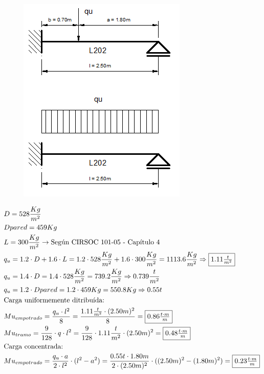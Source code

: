 \begin{enumerate}
\begin{itemize}
\begin{figure}[H]
\begin{center}
     \includegraphics[scale = 0.8]{chapters/chapter_1/images/l202.png}
\end{center}
\end{figure}
\begin{align*}
& D = 528 \frac{Kg}{m^2}\\
& Dpared = 459 Kg\\
& L = 300 \frac{Kg}{m^2} \rightarrow \text{Según CIRSOC 101-05 - Capítulo 4}\\
& q_u = 1.2 \cdot D + 1.6 \cdot L = 1.2 \cdot 528 \frac{Kg}{m^2} + 1.6 \cdot 300 \frac{Kg}{m^2} = 1113.6 \frac{Kg}{m^2} \Rightarrow \framebox{$1.11 \frac{t}{m^2}$} \\
& q_u = 1.4 \cdot D = 1.4 \cdot 528 \frac{Kg}{m^2} = 739.2 \frac{Kg}{m^2} \Rightarrow 0.739 \frac{t}{m^2}\\
& q_u = 1.2 \cdot Dpared = 1.2 \cdot 459Kg = 550.8Kg \Rightarrow 0.55t\\
& \text{Carga uniformemente ditribuída:}\\
& Mu_{empotrado} = \frac{q_u \cdot l^2}{8} = \frac{1.11 \frac{t}{m^2} \cdot (2.50m)^2}{8} = \framebox{$0.86 \frac{t \cdot m}{m}$}\\
& Mu_{tramo} = \frac{9}{128} \cdot q \cdot l^2 = \frac{9}{128} \cdot 1.11 \frac{t}{m^2} \cdot (2.50m)^2 = \framebox{$0.48 \frac{t \cdot m}{m}$}\\
& \text{Carga concentrada:}\\
& Mu_{empotrado} = \frac{q_u \cdot a}{2 \cdot l^2} \cdot (l^2-a^2)= \frac{0.55t \cdot 1.80m}{2 \cdot (2.50m)^2} \cdot ((2.50m)^2-(1.80m)^2) = \framebox{$0.23 \frac{t \cdot m}{m}$}\\

\end{align*}
\end{itemize}
\end{enumerate}
